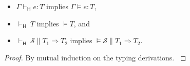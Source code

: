 \documentclass[9pt]{extarticle}
\newcommand{\ottnt}[1]{\mathit{#1}}
\newcommand{\ottsym}[1]{#1}
\begin{document}
{\begin{lemma}
  \noindent
  \begin{itemize}
  \item\label{hn:tm} $ \Gamma   \vdash _{  \mathsf{H}  }  \ottnt{e}  :  \ottnt{T} $ implies $\Gamma  \models  \ottnt{e}  \ottsym{:}  \ottnt{T}$,
  \item\label{hn:ty} $ \mathord{  \vdash _{  \mathsf{H}  } }~ \ottnt{T} $ implies $\models  \ottnt{T}$, and
  \item\label{hn:ts} $ \mathord{  \vdash _{  \mathsf{H}  } }~ \mathcal{S}   \mathrel{\parallel}   \ottnt{T_{{\mathrm{1}}}}  \Rightarrow  \ottnt{T_{{\mathrm{2}}}} $ implies $\models  \mathcal{S}  \mathrel{\parallel}  \ottnt{T_{{\mathrm{1}}}}  \Rightarrow  \ottnt{T_{{\mathrm{2}}}}$.
  \end{itemize}
\begin{proof}
    By mutual induction on the typing derivations.
{\iffull
}
\end{proof}
\end{lemma}}
\end{document}
